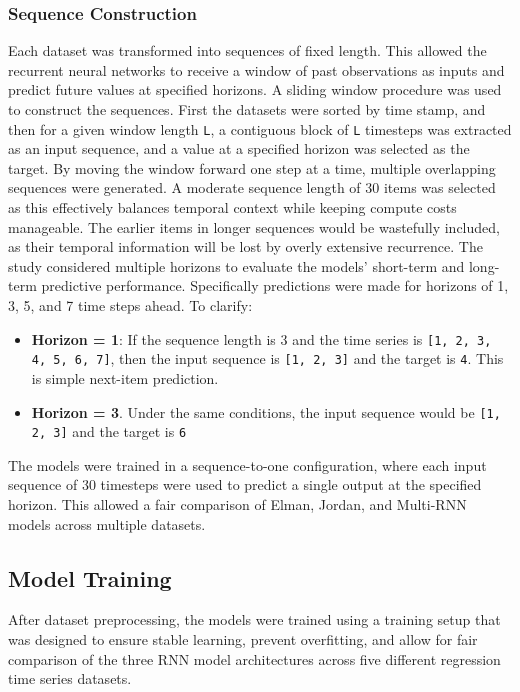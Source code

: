 \documentclass[conference]{IEEEtran}
\begin{document}
\subsubsection{\textbf{Sequence Construction}}
Each dataset was transformed into sequences of fixed length. This allowed the recurrent neural networks to receive a window of past observations as inputs and predict future values at specified horizons.
A sliding window procedure was used to construct the sequences. First the datasets were sorted by time stamp, and then for a given window length \texttt{L}, a contiguous block of \texttt{L} timesteps was extracted as an input sequence, and a value at a specified horizon was selected as the target. By moving the window forward one step at a time, multiple overlapping sequences were generated.
A moderate sequence length of 30 items was selected as this effectively balances temporal context while keeping compute costs manageable. The earlier items in longer sequences would be wastefully included, as their temporal information will be lost by overly extensive recurrence.
The study considered multiple horizons to evaluate the models' short-term and long-term predictive performance. Specifically predictions were made for horizons of 1, 3, 5, and 7 time steps ahead.
To clarify:
\begin{itemize}
    \item \textbf{Horizon = 1}: If the sequence length is 3 and the time series is \texttt{[1, 2, 3, 4, 5, 6, 7]}, then the input sequence is \texttt{[1, 2, 3]} and the target is \texttt{4}. This is simple next-item prediction.
    \item \textbf{Horizon = 3}. Under the same conditions, the input sequence would be \texttt{[1, 2, 3]} and the target is \texttt{6}
\end{itemize}
The models were trained in a sequence-to-one configuration, where each input sequence of 30 timesteps were used to predict a single output at the specified horizon. This allowed a fair comparison of Elman, Jordan, and Multi-RNN models across multiple datasets.

\subsection{\textbf{Model Training}}
After dataset preprocessing, the models were trained using a training setup that was designed to ensure stable learning, prevent overfitting, and allow for fair comparison of the three RNN model architectures across five different regression time series datasets.
\end{document}
